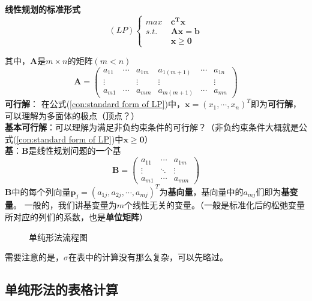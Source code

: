 \documentclass{book}
\begin{document}
\textbf{线性规划的标准形式}
\begin{equation}
    (LP)
    \begin{cases}
        max\  & \boldsymbol{c^Tx}              \\
        s.t.  & \boldsymbol{Ax}=\boldsymbol{b} \\
              & \boldsymbol{x\ge0}
    \end{cases}
    \label{con:standard form of LP}
\end{equation}

其中，$\boldsymbol{A}$是$m\times n$的矩阵$(m<n)$
$$\boldsymbol{A}=
    \begin{pmatrix}
        a_{11} & \cdots & a_{1m} & a_{1(m+1)} & \cdots & a_{1n} \\
        \vdots &        & \vdots & \vdots     &        & \vdots \\
        a_{m1} & \cdots & a_{mm} & a_{m(m+1)} & \cdots & a_{mn}
    \end{pmatrix}
$$
\textbf{可行解}：
在公式(\ref{con:standard form of LP})中，$\boldsymbol{x}=(x_1, \cdots, x_n)^T$即为\textbf{可行解}，可以理解为多面体的极点（顶点？）\\
\textbf{基本可行解}：可以理解为满足非负约束条件的可行解？（非负约束条件大概就是公式(\ref{con:standard form of LP})中$\boldsymbol{x\ge0}$）\\
\textbf{基}：$\boldsymbol{B}$是线性规划问题的一个基
$$\boldsymbol{B}=
    \begin{pmatrix}
        a_{11} & \cdots & a_{1m} \\
        \vdots & \ddots & \vdots \\
        a_{m1} & \cdots & a_{mm}
    \end{pmatrix}$$
$\boldsymbol{B}$中的每个列向量$\boldsymbol{p}_j=(a_{1j}, a_{2j}, \cdots, a_{mj})^T$为\textbf{基向量}，基向量中的$a_{mj}$们即为\textbf{基变量}。
一般的，我们讲基变量为$m$个线性无关的变量。（一般是标准化后的松弛变量所对应的列们的系数，也是\textbf{单位矩阵}）

\begin{figure}[ht]
    \centering
    
    \caption{单纯形法流程图}
    \label{fig:SimplexMethodFlow}
\end{figure}


需要注意的是，$\sigma$在表中的计算没有那么复杂，可以先略过。

\subsection{单纯形法的表格计算}
\end{document}

